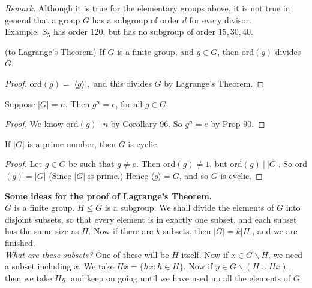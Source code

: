 \documentclass[twoside]{scrartcl}
\begin{document}
\noindent \textit{Remark.} Although it is true for the elementary groups above, it is not true in general that a group $G$ has a subgroup of order $d$ for every divisor.\\
 Example: $S_5$ has order 120, but has no subgroup of order $15,30,40$.\\
 
 
\begin{corollary} (to Lagrange's Theorem) If $G$ is a finite group, and $g \in G$, then ord$(g)$ divides $G$.	
\end{corollary}


\begin{proof}
ord$(g) = |\langle g \rangle|,$ and this divides $G$ by Lagrange's Theorem.	
\end{proof}\vspace*{10pt}

\begin{corollary}Suppose $|G| = n$. Then $g^n = e$, for all $g \in G.$	
\end{corollary}

\begin{proof}
We know ord$(g) ~|~ n$ by Corollary 96. So $g^n = e$ by Prop 90.
\end{proof}\vspace*{10pt}

\begin{corollary} If $|G|$ is a prime number, then $G$ is cyclic.	
\end{corollary}

\begin{proof}
Let $g \in G$ be such that $g \neq e$. Then ord$(g)\neq 1$, but ord$(g) ~|~ |G|$. So ord$(g) = |G|$ (Since $|G|$ is prime.)	Hence $\langle g \rangle = G$, and so $G$ is cyclic.
\end{proof}\vspace*{15pt}


\textbf{Some ideas for the proof of Lagrange's Theorem.}\\

$G$ is a finite group. $H \leq G$ is a subgroup. We shall divide the elements of $G$ into disjoint subsets, so that every element is in exactly one subset, and each subset has the same size as $H$. Now if there are $k$ subsets, then $|G| = k|H|$, and we are finished.\\

\textit{What are these subsets?} One of these will be $H$ itself. Now if $x \in G\backslash H$, we need a subset including $x$. We take $Hx = \{hx : h \in H\}$. Now if $y \in G \backslash(H \cup Hx)$, then we take $Hy$, and keep on going until we have used up all the elements of $G$.\\
\end{document}

